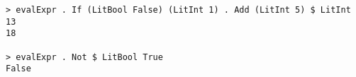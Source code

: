 \begin{repl}\begin{lstlisting}
> evalExpr . If (LitBool False) (LitInt 1) . Add (LitInt 5) $ LitInt 13
18

> evalExpr . Not $ LitBool True
False\end{lstlisting}\end{repl}
